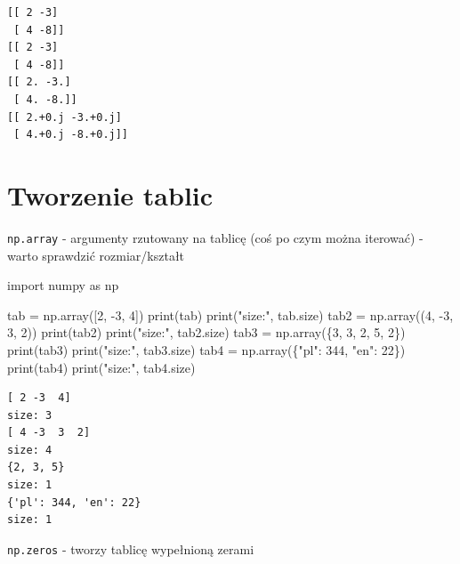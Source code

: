 \documentclass[
  letterpaper,
  DIV=11,
  numbers=noendperiod]{scrreprt}
\newenvironment{Shaded}{\begin{snugshade}}{\end{snugshade}}
\newcommand{\BuiltInTok}[1]{\textcolor[rgb]{0.00,0.23,0.31}{#1}}
\newcommand{\DecValTok}[1]{\textcolor[rgb]{0.68,0.00,0.00}{#1}}
\newcommand{\ImportTok}[1]{\textcolor[rgb]{0.00,0.46,0.62}{#1}}
\newcommand{\NormalTok}[1]{\textcolor[rgb]{0.00,0.23,0.31}{#1}}
\newcommand{\OperatorTok}[1]{\textcolor[rgb]{0.37,0.37,0.37}{#1}}
\newcommand{\StringTok}[1]{\textcolor[rgb]{0.13,0.47,0.30}{#1}}
\begin{document}
\begin{verbatim}
[[ 2 -3]
 [ 4 -8]]
[[ 2 -3]
 [ 4 -8]]
[[ 2. -3.]
 [ 4. -8.]]
[[ 2.+0.j -3.+0.j]
 [ 4.+0.j -8.+0.j]]
\end{verbatim}

\chapter{Tworzenie tablic}\label{tworzenie-tablic}

\texttt{np.array} - argumenty rzutowany na tablicę (coś po czym można
iterować) - warto sprawdzić rozmiar/kształt

\begin{Shaded}
\begin{Highlighting}[]
\ImportTok{import}\NormalTok{ numpy }\ImportTok{as}\NormalTok{ np}

\NormalTok{tab }\OperatorTok{=}\NormalTok{ np.array([}\DecValTok{2}\NormalTok{, }\OperatorTok{{-}}\DecValTok{3}\NormalTok{, }\DecValTok{4}\NormalTok{])}
\BuiltInTok{print}\NormalTok{(tab)}
\BuiltInTok{print}\NormalTok{(}\StringTok{"size:"}\NormalTok{, tab.size)}
\NormalTok{tab2 }\OperatorTok{=}\NormalTok{ np.array((}\DecValTok{4}\NormalTok{, }\OperatorTok{{-}}\DecValTok{3}\NormalTok{, }\DecValTok{3}\NormalTok{, }\DecValTok{2}\NormalTok{))}
\BuiltInTok{print}\NormalTok{(tab2)}
\BuiltInTok{print}\NormalTok{(}\StringTok{"size:"}\NormalTok{, tab2.size)}
\NormalTok{tab3 }\OperatorTok{=}\NormalTok{ np.array(\{}\DecValTok{3}\NormalTok{, }\DecValTok{3}\NormalTok{, }\DecValTok{2}\NormalTok{, }\DecValTok{5}\NormalTok{, }\DecValTok{2}\NormalTok{\})}
\BuiltInTok{print}\NormalTok{(tab3)}
\BuiltInTok{print}\NormalTok{(}\StringTok{"size:"}\NormalTok{, tab3.size)}
\NormalTok{tab4 }\OperatorTok{=}\NormalTok{ np.array(\{}\StringTok{"pl"}\NormalTok{: }\DecValTok{344}\NormalTok{, }\StringTok{"en"}\NormalTok{: }\DecValTok{22}\NormalTok{\})}
\BuiltInTok{print}\NormalTok{(tab4)}
\BuiltInTok{print}\NormalTok{(}\StringTok{"size:"}\NormalTok{, tab4.size)}
\end{Highlighting}
\end{Shaded}

\begin{verbatim}
[ 2 -3  4]
size: 3
[ 4 -3  3  2]
size: 4
{2, 3, 5}
size: 1
{'pl': 344, 'en': 22}
size: 1
\end{verbatim}

\texttt{np.zeros} - tworzy tablicę wypełnioną zerami
\end{document}

